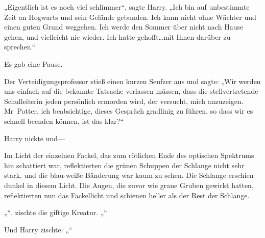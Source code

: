 „Eigentlich ist es noch viel schlimmer“, sagte Harry. „Ich bin auf unbestimmte Zeit an Hogwarts und sein Gelände gebunden. Ich kann nicht ohne Wächter und einen guten Grund weggehen. Ich werde den Sommer über nicht nach Hause gehen, und vielleicht nie wieder. Ich hatte gehofft…mit Ihnen darüber zu sprechen.“

Es gab eine Pause.

Der Verteidigungsprofessor stieß einen kurzen Seufzer aus und sagte: „Wir werden uns einfach auf die bekannte Tatsache verlassen müssen, dass die stellvertretende Schulleiterin jeden persönlich ermorden wird, der versucht, mich anzuzeigen. Mr~Potter, ich beabsichtige, dieses Gespräch gradlinig zu führen, so dass wir es schnell beenden können, ist das klar?“

Harry nickte und—

Im Licht der einzelnen Fackel, das zum rötlichen Ende des optischen Spektrums hin schattiert war, reflektierten die grünen Schuppen der Schlange nicht sehr stark, und die blau-weiße Bänderung war kaum zu sehen. Die Schlange erschien dunkel in diesem Licht. Die Augen, die zuvor wie graue Gruben gewirkt hatten, reflektierten nun das Fackellicht und schienen heller als der Rest der Schlange.

„“, zischte die giftige Kreatur. „“

Und Harry zischte: „“

